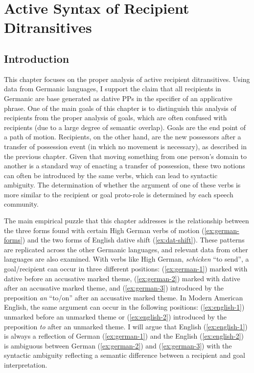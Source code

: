 \chapter{Active Syntax of Recipient Ditransitives}\label{ch:active}
\section{Introduction}
This chapter focuses on the proper analysis of active recipient ditransitives. Using data from Germanic languages, I support the claim that all recipients in Germanic are base generated as dative PPs in the specifier of an applicative phrase. One of the main goals of this chapter is to distinguish this analysis of recipients from the proper analysis of goals, which are often confused with recipients (due to a large degree of semantic overlap). Goals are the end point of a path of motion. Recipients, on the other hand, are the new possessors after a transfer of possession event (in which no movement is necessary), as described in the previous chapter. Given that moving something from one person's domain to another is a standard way of enacting a transfer of possession, these two notions can often be introduced by the same verbs, which can lead to syntactic ambiguity. The determination of whether the argument of one of these verbs is more similar to the recipient or goal proto-role is determined by each speech community.

The main empirical puzzle that this chapter addresses is the relationship between the three forms found with certain High German verbs of motion (\ref{ex:german-forms}) and the two forms of English dative shift (\ref{ex:dat-shift}). These patterns are replicated across the other Germanic languages, and relevant data from other languages are also examined. With verbs like High German, \textit{schicken} ``to send'', a goal/recipient can occur in three different positions: (\ref{ex:german-1}) marked with dative before an accusative marked theme, (\ref{ex:german-2}) marked with dative after an accusative marked theme, and (\ref{ex:german-3}) introduced by the preposition \textit{an} ``to/on'' after an accusative marked theme. In Modern American English, the same argument can occur in the following positions: (\ref{ex:english-1}) unmarked before an unmarked theme or (\ref{ex:english-2}) introduced by the preposition \textit{to} after an unmarked theme. I will argue that English (\ref{ex:english-1}) is always a reflection of German (\ref{ex:german-1}) and the English (\ref{ex:english-2}) is ambiguous between German (\ref{ex:german-2}) and (\ref{ex:german-3}) with the syntactic ambiguity reflecting a semantic difference between a recipient and goal interpretation.

